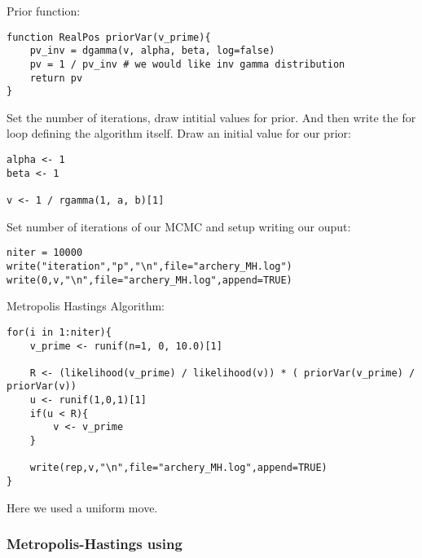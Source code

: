 Prior function: 

{\tt \begin{snugshade*}
 \begin{lstlisting}
function RealPos priorVar(v_prime){
	pv_inv = dgamma(v, alpha, beta, log=false)
	pv = 1 / pv_inv # we would like inv gamma distribution
	return pv
}
\end{lstlisting}
\end{snugshade*}}



Set the number of iterations, draw intitial values for prior. And then write the for loop defining the algorithm itself. 
Draw an initial value for our prior:

{\tt \begin{snugshade*}
 \begin{lstlisting}
alpha <- 1
beta <- 1

v <- 1 / rgamma(1, a, b)[1]
\end{lstlisting}
\end{snugshade*}}

Set number of iterations of our MCMC and setup writing our ouput:

{\tt \begin{snugshade*}
 \begin{lstlisting}
niter = 10000
write("iteration","p","\n",file="archery_MH.log")
write(0,v,"\n",file="archery_MH.log",append=TRUE)
\end{lstlisting}
\end{snugshade*}}


Metropolis Hastings Algorithm:

{\tt \begin{snugshade*}
 \begin{lstlisting}
for(i in 1:niter){
	v_prime <- runif(n=1, 0, 10.0)[1]
    
	R <- (likelihood(v_prime) / likelihood(v)) * ( priorVar(v_prime) / priorVar(v))
	u <- runif(1,0,1)[1]
	if(u < R){
		v <- v_prime
	}

	write(rep,v,"\n",file="archery_MH.log",append=TRUE)
}
\end{lstlisting}
\end{snugshade*}}


Here we used a uniform move. 

\subsubsection{Metropolis-Hastings using \RevBayes}

